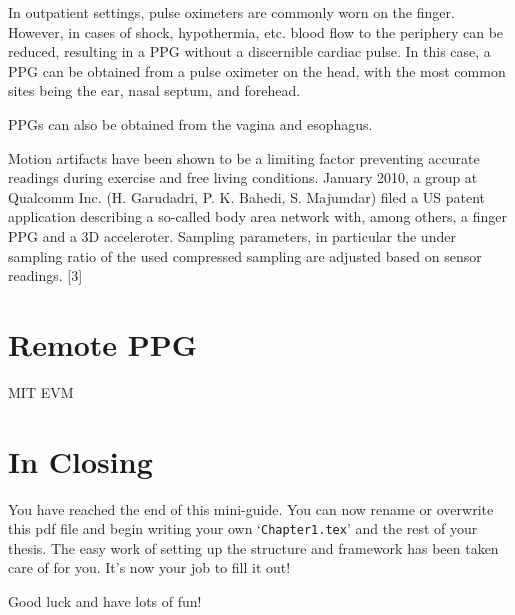In outpatient settings, pulse oximeters are commonly worn on the finger.
However, in cases of shock, hypothermia, etc. blood flow to the periphery
can be reduced, resulting in a PPG without a discernible cardiac pulse.
In this case, a PPG can be obtained from a pulse oximeter on the head,
with the most common sites being the ear, nasal septum, and forehead.

PPGs can also be obtained from the vagina and esophagus.

Motion artifacts have been shown to be a limiting factor preventing accurate readings
during exercise and free living conditions.
January 2010, a group at Qualcomm Inc. (H. Garudadri, P. K. Bahedi, S. Majumdar)
filed a US patent application describing a so-called body area network with,
among others, a finger PPG and a 3D acceleroter. Sampling parameters,
in particular the under sampling ratio of the used compressed sampling are adjusted based
on sensor readings. [3]

\section{Remote PPG}

\begin{compactitem}

\item MIT EVM
\end{compactitem}


\section{In Closing}

You have reached the end of this mini-guide. You can now rename or overwrite this pdf file and begin writing your own `\texttt{Chapter1.tex}' and the rest of your thesis. The easy work of setting up the structure and framework has been taken care of for you. It's now your job to fill it out!

Good luck and have lots of fun!
